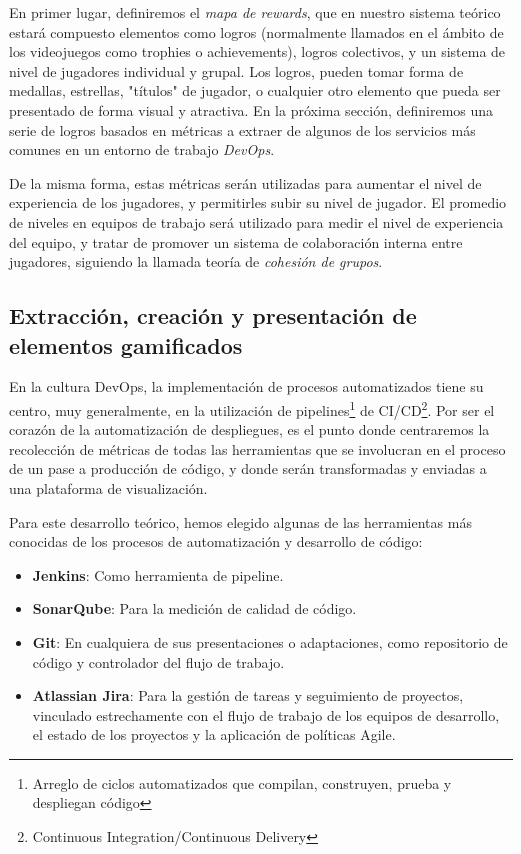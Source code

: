 \documentclass[journal]{IEEEtran}
\begin{document}
En primer lugar, definiremos el \textit{mapa de rewards}, que en nuestro sistema teórico estará compuesto elementos como logros (normalmente llamados en el ámbito de los videojuegos como trophies o achievements), logros colectivos, y un sistema de nivel de jugadores individual y grupal. Los logros, pueden tomar forma de medallas, estrellas, "títulos" de jugador, o cualquier otro elemento que pueda ser presentado de forma visual y atractiva. En la próxima sección, definiremos una serie de logros basados en métricas a extraer de algunos de los servicios más comunes en un entorno de trabajo \textit{DevOps}.

De la misma forma, estas métricas serán utilizadas para aumentar el nivel de experiencia de los jugadores, y permitirles subir su nivel de jugador. El promedio de niveles en equipos de trabajo será utilizado para medir el nivel de experiencia del equipo, y tratar de promover un sistema de colaboración interna entre jugadores, siguiendo la llamada teoría de \textit{cohesión de grupos}\cite{mueller2024leveraging}.

\subsection{\textbf{Extracción, creación y presentación de elementos gamificados}} \label{extraccion-creacion-presentacion}

En la cultura DevOps, la implementación de procesos automatizados tiene su centro, muy generalmente, en la utilización de pipelines\footnote{Arreglo de ciclos automatizados que compilan, construyen, prueba y despliegan código} de CI/CD\footnote{Continuous Integration/Continuous Delivery}. Por ser el corazón de la automatización de despliegues, es el punto donde centraremos la recolección de métricas de todas las herramientas que se involucran en el proceso de un pase a producción de código, y donde serán transformadas y enviadas a una plataforma de visualización.

Para este desarrollo teórico, hemos elegido algunas de las herramientas más conocidas de los procesos de automatización y desarrollo de código: 
\begin{itemize}
    \item \textbf{Jenkins}\cite{jenkins}: Como herramienta de pipeline.
    \item \textbf{SonarQube}\cite{sonarqube}: Para la medición de calidad de código.
    \item \textbf{Git}\cite{git}: En cualquiera de sus presentaciones o adaptaciones, como repositorio de código y controlador del flujo de trabajo.
    \item \textbf{Atlassian Jira}\cite{jira}: Para la gestión de tareas y seguimiento de proyectos, vinculado estrechamente con el flujo de trabajo de los equipos de desarrollo, el estado de los proyectos y la aplicación de políticas Agile.
\end{itemize} 
\end{document}
